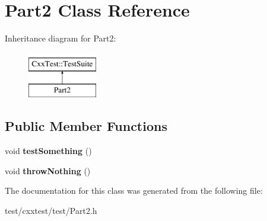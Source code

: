 \hypertarget{classPart2}{\section{Part2 Class Reference}
\label{classPart2}
}
Inheritance diagram for Part2\-:\begin{figure}[H]
\begin{center}
\leavevmode
\includegraphics[height=2.000000cm]{classPart2}
\end{center}
\end{figure}
\subsection*{Public Member Functions}
\begin{DoxyCompactItemize}
\item 
\hypertarget{classPart2_aed5cb43b43dc2a0578354b64adf169ed}{void {\bfseries test\-Something} ()}\label{classPart2_aed5cb43b43dc2a0578354b64adf169ed}

\item 
\hypertarget{classPart2_a8f2036d05fff2d8562590b852fce8a7e}{void {\bfseries throw\-Nothing} ()}\label{classPart2_a8f2036d05fff2d8562590b852fce8a7e}

\end{DoxyCompactItemize}


The documentation for this class was generated from the following file\-:\begin{DoxyCompactItemize}
\item 
test/cxxtest/test/Part2.\-h\end{DoxyCompactItemize}
